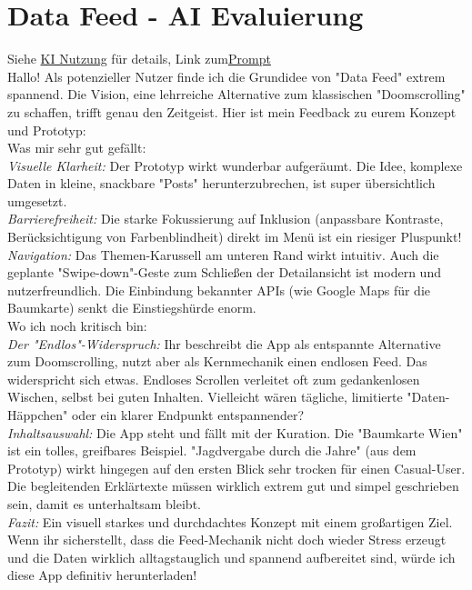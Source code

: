 \section{Data Feed - AI Evaluierung}
Siehe \href{sec:KI}{KI Nutzung} für details, Link zum\href{https://gemini.google.com/share/5f8f9fe4f518}{Prompt}\\

\noindent
Hallo! Als potenzieller Nutzer finde ich die Grundidee von "Data Feed" extrem spannend. Die Vision, eine lehrreiche Alternative zum klassischen "Doomscrolling" zu schaffen, trifft genau den Zeitgeist. Hier ist mein Feedback zu eurem Konzept und Prototyp:
\\

\noindent
Was mir sehr gut gefällt:
\\

\noindent
\emph{Visuelle Klarheit:} Der Prototyp wirkt wunderbar aufgeräumt. Die Idee, komplexe Daten in kleine, snackbare "Posts" herunterzubrechen, ist super übersichtlich umgesetzt.
\\

\noindent
\emph{Barrierefreiheit:} Die starke Fokussierung auf Inklusion (anpassbare Kontraste, Berücksichtigung von Farbenblindheit) direkt im Menü ist ein riesiger Pluspunkt!
\\

\noindent
\emph{Navigation:} Das Themen-Karussell am unteren Rand wirkt intuitiv. Auch die geplante "Swipe-down"-Geste zum Schließen der Detailansicht ist modern und nutzerfreundlich. Die Einbindung bekannter APIs (wie Google Maps für die Baumkarte) senkt die Einstiegshürde enorm.
\\

\noindent
Wo ich noch kritisch bin:
\\

\noindent
\emph{Der "Endlos"-Widerspruch:} Ihr beschreibt die App als entspannte Alternative zum Doomscrolling, nutzt aber als Kernmechanik einen endlosen Feed. Das widerspricht sich etwas. Endloses Scrollen verleitet oft zum gedankenlosen Wischen, selbst bei guten Inhalten. Vielleicht wären tägliche, limitierte "Daten-Häppchen" oder ein klarer Endpunkt entspannender?
\\

\noindent
\emph{Inhaltsauswahl:} Die App steht und fällt mit der Kuration. Die "Baumkarte Wien" ist ein tolles, greifbares Beispiel. "Jagdvergabe durch die Jahre" (aus dem Prototyp) wirkt hingegen auf den ersten Blick sehr trocken für einen Casual-User. Die begleitenden Erklärtexte müssen wirklich extrem gut und simpel geschrieben sein, damit es unterhaltsam bleibt.
\\

\noindent
\emph{Fazit:} Ein visuell starkes und durchdachtes Konzept mit einem großartigen Ziel. Wenn ihr sicherstellt, dass die Feed-Mechanik nicht doch wieder Stress erzeugt und die Daten wirklich alltagstauglich und spannend aufbereitet sind, würde ich diese App definitiv herunterladen!

